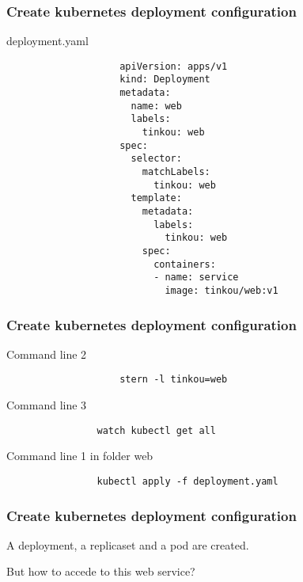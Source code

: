 	\begin{frame}[fragile]
		\frametitle{Create kubernetes deployment configuration}
		\begin{block}{deployment.yaml}
			\begin{tiny}
				\begin{verbatim}
					apiVersion: apps/v1
					kind: Deployment
					metadata:
					  name: web
					  labels:
					    tinkou: web
					spec:
					  selector:
					    matchLabels:
					      tinkou: web
					  template:
					    metadata:
					      labels:
					        tinkou: web
					    spec:
					      containers:
					      - name: service
					        image: tinkou/web:v1
				\end{verbatim}
			\end{tiny}
		\end{block}
	\end{frame}
	
	\begin{frame}[fragile]
		\frametitle{Create kubernetes deployment configuration}

		\begin{block}{Command line 2}
			\begin{small}
				\begin{verbatim}
					stern -l tinkou=web
				\end{verbatim}
			\end{small}
		\end{block}
		
		\begin{block}{Command line 3}
			\begin{verbatim}
				watch kubectl get all
			\end{verbatim}
		\end{block}
		
		\begin{block}{Command line 1 in folder web}
			\begin{verbatim}
				kubectl apply -f deployment.yaml
			\end{verbatim}
		\end{block}
	\end{frame}
	
	\begin{frame}
		\frametitle{Create kubernetes deployment configuration}
		
		A deployment, a replicaset and a pod are created.
		
		\bigskip
		
		But how to accede to this web service?
	\end{frame}
	
